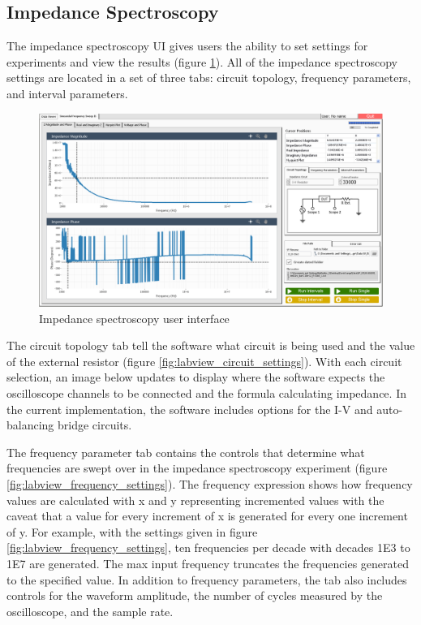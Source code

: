 \subsection{Impedance Spectroscopy}
\par The impedance spectroscopy UI gives users the ability to set settings for experiments and view the results (figure \ref{fig:is_gui}). All of the impedance spectroscopy settings are located in a set of three tabs: circuit topology, frequency parameters, and interval parameters. 

\begin{figure}[h]
    \centering
    \includegraphics[width=\textwidth]{images/IS_gui.png}
    \caption{Impedance spectroscopy user interface}
    \label{fig:is_gui}
\end{figure}

\par The circuit topology tab tell the software what circuit is being used and the value of the external resistor (figure \ref{fig:labview_circuit_settings}). With each circuit selection, an image below updates to display where the software expects the oscilloscope channels to be connected and the formula calculating impedance. In the current implementation, the software includes options for the I-V and auto-balancing bridge circuits. 


\par The frequency parameter tab contains the controls that determine what frequencies are swept over in the impedance spectroscopy experiment (figure \ref{fig:labview_frequency_settings}). The frequency expression shows how frequency values are calculated with x and y representing incremented values with the caveat that a value for every increment of x is generated for every one increment of y. For example, with the settings given in figure \ref{fig:labview_frequency_settings}, ten frequencies per decade with decades 1E3 to 1E7 are generated. The max input frequency truncates the frequencies generated to the specified value. In addition to frequency parameters, the tab also includes controls for the waveform amplitude, the number of cycles measured by the oscilloscope, and the sample rate. 

